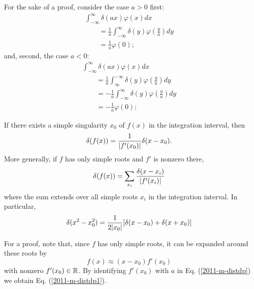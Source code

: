{\color{OliveGreen}
\bproof
For the sake of a proof,  consider the case $a>0$ first:
 \begin{equation}
 \begin{split}
\int _{-\infty}^\infty \delta (ax)  \varphi (x)  dx          \\
\qquad =
\frac{1}{a}\int _{-\infty}^\infty \delta (y)  \varphi (\frac{y}{a}) dy  \\
\qquad =    \frac{1}{a}  \varphi (0);
 \end{split}
 \end{equation}
and, second, the case $a<0$:
 \begin{equation}
 \begin{split}
\int _{-\infty}^\infty \delta (ax)  \varphi (x)  dx     \\
\qquad =
\frac{1}{a}\int _\infty^{-\infty} \delta (y)  \varphi (\frac{y}{a}) dy \\
\qquad =
- \frac{1}{a}\int _{-\infty}^\infty \delta (y)  \varphi (\frac{y}{a}) dy       \\
\qquad =   - \frac{1}{a}  \varphi (0);
 \end{split}
 \end{equation}
\eproof
}

If there exists a simple singularity $x_0$ of $f(x)$ in the
integration interval, then
\begin{equation}
 \delta (f(x))={1\over \vert f'(x_0)\vert }\delta(x-x_0)
.
 \end{equation}
More generally,  if $f$ has only simple roots and $f'$ is nonzero there,
\begin{equation}
 \delta (f(x))=\sum_{x_i}{\delta(x-x_i)\over \vert f'(x_i)\vert }
\label{2011-m-distdp1}
 \end{equation}
where the sum extends over all simple roots $x_i$ in
the integration interval.
In particular,
 \begin{equation}
 \delta (x^2-x_0^2)={1\over 2\vert x_0\vert }[\delta (x-x_0)+\delta
 (x+x_0)] \end{equation}
{\color{OliveGreen}
\bproof
For a proof, note that, since $f$ has only simple roots,
it can be expanded around these roots by
$$
f(x) \approx (x-x_0) f'(x_0)
$$
with nonzero $f'(x_0) \in {\Bbb R}$.
By identifying  $f'(x_0)$ with $a$ in
Eq. (\ref{2011-m-distdp})
we obtain
Eq. (\ref{2011-m-distdp1}).

\eproof
}


